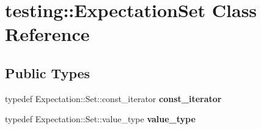 \hypertarget{classtesting_1_1_expectation_set}{}\section{testing\+:\+:Expectation\+Set Class Reference}
\label{classtesting_1_1_expectation_set}
\subsection*{Public Types}
\begin{DoxyCompactItemize}
\item 
\mbox{\label{classtesting_1_1_expectation_set_ab269a45f80d8c4f747b29de454a084bb}} 
typedef Expectation\+::\+Set\+::const\+\_\+iterator {\bfseries const\+\_\+iterator}
\item 
\mbox{\label{classtesting_1_1_expectation_set_aab6d2d4800cec231bcedae33deaca7f6}} 
typedef Expectation\+::\+Set\+::value\+\_\+type {\bfseries value\+\_\+type}
\end{DoxyCompactItemize}
